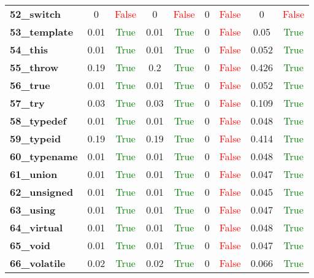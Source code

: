 \documentclass{article}
\begin{document}
\begin{xltabular}{\textwidth}{lcccccccc}
\textbf{52\_switch}& 0&\textcolor{red}{False}& 0&\textcolor{red}{False}& 0&\textcolor{red}{False}& 0&\textcolor{red}{False} \\[0.5ex]
\textbf{53\_template}& 0.01&\textcolor{green}{True}& 0.01&\textcolor{green}{True}& 0&\textcolor{red}{False}& 0.05&\textcolor{green}{True} \\[0.5ex]
\textbf{54\_this}& 0.01&\textcolor{green}{True}& 0.01&\textcolor{green}{True}& 0&\textcolor{red}{False}& 0.052&\textcolor{green}{True} \\[0.5ex]
\textbf{55\_throw}& 0.19&\textcolor{green}{True}& 0.2&\textcolor{green}{True}& 0&\textcolor{red}{False}& 0.426&\textcolor{green}{True} \\[0.5ex]
\textbf{56\_true}& 0.01&\textcolor{green}{True}& 0.01&\textcolor{green}{True}& 0&\textcolor{red}{False}& 0.052&\textcolor{green}{True} \\[0.5ex]
\textbf{57\_try}& 0.03&\textcolor{green}{True}& 0.03&\textcolor{green}{True}& 0&\textcolor{red}{False}& 0.109&\textcolor{green}{True} \\[0.5ex]
\textbf{58\_typedef}& 0.01&\textcolor{green}{True}& 0.01&\textcolor{green}{True}& 0&\textcolor{red}{False}& 0.048&\textcolor{green}{True} \\[0.5ex]
\textbf{59\_typeid}& 0.19&\textcolor{green}{True}& 0.19&\textcolor{green}{True}& 0&\textcolor{red}{False}& 0.414&\textcolor{green}{True} \\[0.5ex]
\textbf{60\_typename}& 0.01&\textcolor{green}{True}& 0.01&\textcolor{green}{True}& 0&\textcolor{red}{False}& 0.048&\textcolor{green}{True} \\[0.5ex]
\textbf{61\_union}& 0.01&\textcolor{green}{True}& 0.01&\textcolor{green}{True}& 0&\textcolor{red}{False}& 0.047&\textcolor{green}{True} \\[0.5ex]
\textbf{62\_unsigned}& 0.01&\textcolor{green}{True}& 0.01&\textcolor{green}{True}& 0&\textcolor{red}{False}& 0.045&\textcolor{green}{True} \\[0.5ex]
\textbf{63\_using}& 0.01&\textcolor{green}{True}& 0.01&\textcolor{green}{True}& 0&\textcolor{red}{False}& 0.047&\textcolor{green}{True} \\[0.5ex]
\textbf{64\_virtual}& 0.01&\textcolor{green}{True}& 0.01&\textcolor{green}{True}& 0&\textcolor{red}{False}& 0.048&\textcolor{green}{True} \\[0.5ex]
\textbf{65\_void}& 0.01&\textcolor{green}{True}& 0.01&\textcolor{green}{True}& 0&\textcolor{red}{False}& 0.047&\textcolor{green}{True} \\[0.5ex]
\textbf{66\_volatile}& 0.02&\textcolor{green}{True}& 0.02&\textcolor{green}{True}& 0&\textcolor{red}{False}& 0.066&\textcolor{green}{True} \\[0.5ex]

\end{xltabular}
\end{document}
